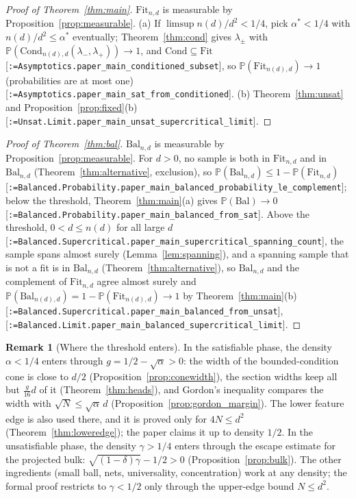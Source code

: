 \documentclass[11pt]{article}
\makeatletter
\newcommand{\formal@break}[1]{\@tfor\formal@tok:=#1\do{%
  \formal@tok
  \expandafter\ifx\formal@tok.\allowbreak\else
  \expandafter\ifx\formal@tok\_\allowbreak\fi\fi}}
\DeclareRobustCommand{\formal}[1]{\textnormal{[\texttt{\small\formal@break{#1}}]}}
\newcommand{\Prob}{\mathbb{P}}
\newcommand{\Fit}{\mathrm{Fit}}
\newcommand{\Cond}{\mathrm{Cond}}
\newcommand{\Bal}{\mathrm{Bal}}
\theoremstyle{plain}
\theoremstyle{definition}
\newtheorem{remark}[theorem]{Remark}
\makeatother
\begin{document}
\begin{proof}[Proof of Theorem~\ref{thm:main}]
$\Fit_{n,d}$ is measurable by Proposition~\ref{prop:measurable}.
(a) If $\limsup n(d)/d^2 < 1/4$, pick $\alpha^* < 1/4$ with
$n(d)/d^2 \le \alpha^*$ eventually; Theorem~\ref{thm:cond} gives
$\lambda_\pm$ with $\Prob(\Cond_{n(d),d}(\lambda_-,\lambda_+)) \to 1$, and
$\Cond \subseteq \Fit$ \formal{Asymptotics.paper\_main\_conditioned\_subset},
so $\Prob(\Fit_{n(d),d}) \to 1$ (probabilities are at most one)
\formal{Asymptotics.paper\_main\_sat\_from\_conditioned}.
(b) Theorem~\ref{thm:unsat} and Proposition~\ref{prop:fixed}(b)
\formal{Unsat.Limit.paper\_main\_unsat\_supercritical\_limit}.
\end{proof}

\begin{proof}[Proof of Theorem~\ref{thm:bal}]
$\Bal_{n,d}$ is measurable by Proposition~\ref{prop:measurable}. For
$d > 0$, no sample is both in $\Fit_{n,d}$ and in $\Bal_{n,d}$
(Theorem~\ref{thm:alternative}, exclusion), so
$\Prob(\Bal_{n,d}) \le 1 - \Prob(\Fit_{n,d})$
\formal{Balanced.Probability.paper\_main\_balanced\_probability\_le\_complement};
below the threshold, Theorem~\ref{thm:main}(a) gives $\Prob(\Bal) \to 0$
\formal{Balanced.Probability.paper\_main\_balanced\_from\_sat}. Above the
threshold, $0 < d \le n(d)$ for all large $d$
\formal{Balanced.Supercritical.paper\_main\_supercritical\_spanning\_count},
the sample spans almost surely (Lemma~\ref{lem:spanning}), and a spanning
sample that is not a fit is in $\Bal_{n,d}$ (Theorem~\ref{thm:alternative}),
so $\Bal_{n,d}$ and the complement of $\Fit_{n,d}$ agree almost surely and
$\Prob(\Bal_{n(d),d}) = 1 - \Prob(\Fit_{n(d),d}) \to 1$ by
Theorem~\ref{thm:main}(b) \formal{Balanced.Supercritical.paper\_main\_balanced\_from\_unsat},
\formal{Balanced.Limit.paper\_main\_balanced\_supercritical\_limit}.
\end{proof}

\begin{remark}[Where the threshold enters]
In the satisfiable phase, the density $\alpha < 1/4$ enters through
$g = 1/2 - \sqrt\alpha > 0$: the width of the bounded-condition cone is
close to $d/2$ (Proposition~\ref{prop:conewidth}), the section widths keep
all but $\frac g{16}d$ of it (Theorem~\ref{thm:heads}), and Gordon's
inequality compares the width with $\sqrt N \le \sqrt\alpha\,d$
(Proposition~\ref{prop:gordon_margin}). The lower feature edge is also used
there, and it is proved only for $4N \le d^2$ (Theorem~\ref{thm:loweredge});
the paper claims it up to density $1/2$. In the unsatisfiable phase, the
density $\gamma > 1/4$ enters through the escape estimate for the projected
bulk: $\sqrt{(1-\delta)\gamma} - 1/2 > 0$ (Proposition~\ref{prop:bulk}). The
other ingredients (small ball, nets, universality, concentration) work at
any density; the formal proof restricts to $\gamma < 1/2$ only through the
upper-edge bound $N \le d^2$.
\end{remark}
\end{document}

